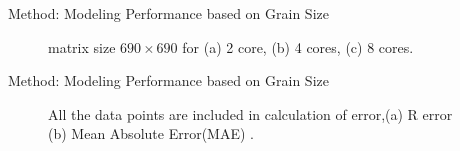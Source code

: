 \documentclass[10pt]{beamer}
\begin{document}
\begin{frame}{Method: Modeling Performance based on Grain Size}
\begin{outline}
\begin{figure}[H]
		\caption{matrix size $690\times690$ for (a) 2 core, (b) 4 cores, (c) 8 cores.}	
		\label{fig18}
	\end{figure}
	\end{outline}
\end{frame}

\begin{frame}{Method: Modeling Performance based on Grain Size}
	\begin{outline}
		\begin{figure}[H]
			\centering
			\caption{All the data points are included in calculation of error,(a) R error (b) Mean Absolute Error(MAE) .}	
			\label{fig17}
		\end{figure}
	\end{outline}
\end{frame}
\end{document}
